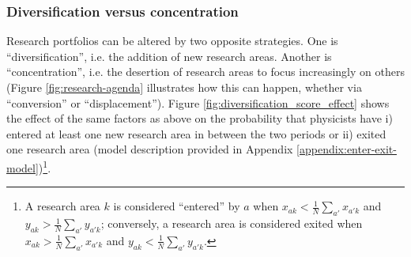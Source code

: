 \documentclass{article}
\begin{document}

\subsubsection{Diversification versus concentration}

Research portfolios can be altered by two opposite strategies. One is ``diversification'', i.e. the addition of new research areas. Another is ``concentration'', i.e. the desertion of research areas to focus increasingly on others (Figure \ref{fig:research-agenda} illustrates how this can happen, whether via ``conversion'' or ``displacement''). Figure \ref{fig:diversification_score_effect} shows the effect of the same factors as above on the probability that physicists have i) entered at least one new research area in between the two periods or ii) exited one research area (model description provided in Appendix \ref{appendix:enter-exit-model})\footnote{A research area $k$ is considered ``entered'' by $a$ when $x_{ak}<\frac{1}{N}\sum_{a'}x_{a'k}$ and $y_{ak}>\frac{1}{N}\sum_{a'}y_{a'k}$; conversely, a research area is considered exited when $x_{ak}>\frac{1}{N}\sum_{a'}x_{a'k}$ and $y_{ak}<\frac{1}{N}\sum_{a'}y_{a'k}$.}.
\end{document}
